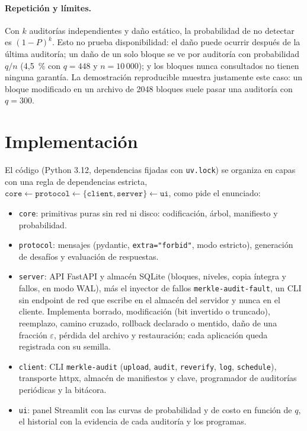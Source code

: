 \documentclass[11pt,a4paper]{article}
\newcommand{\code}[1]{\texttt{#1}}
\begin{document}
\paragraph{Repetición y límites.} Con $k$ auditorías independientes y daño estático, la probabilidad
de no detectar es $(1-P)^k$. Esto no prueba disponibilidad: el daño puede ocurrir después de la
última auditoría; un daño de un solo bloque se ve por auditoría con probabilidad $q/n$ (4,5~\% con
$q=448$ y $n=10\,000$); y los bloques nunca consultados no tienen ninguna garantía. La demostración
reproducible muestra justamente este caso: un bloque modificado en un archivo de 2048 bloques suele
pasar una auditoría con $q=300$.

\section{Implementación}
\label{sec:impl}

El código (Python 3.12, dependencias fijadas con \code{uv.lock}) se organiza en capas con una regla
de dependencias estricta, $\code{core}\leftarrow\code{protocol}\leftarrow\{\code{client},\code{server}\}\leftarrow\code{ui}$,
como pide el enunciado:

\begin{itemize}
\item \code{core}: primitivas puras sin red ni disco: codificación, árbol, manifiesto y probabilidad.
\item \code{protocol}: mensajes (pydantic, \code{extra="forbid"}, modo estricto), generación de
  desafíos y evaluación de respuestas.
\item \code{server}: API FastAPI y almacén SQLite (bloques, niveles, copia íntegra y fallos, en modo
  WAL), más el inyector de fallos \code{merkle-audit-fault}, un CLI sin endpoint de red que escribe
  en el almacén del servidor y nunca en el cliente. Implementa borrado, modificación (bit invertido o
  truncado), reemplazo, camino cruzado, rollback declarado o mentido, daño de una fracción $\varepsilon$,
  pérdida del archivo y restauración; cada aplicación queda registrada con su semilla.
\item \code{client}: CLI \code{merkle-audit} (\code{upload}, \code{audit}, \code{reverify},
  \code{log}, \code{schedule}), transporte httpx, almacén de manifiestos y clave, programador de
  auditorías periódicas y la bitácora.
\item \code{ui}: panel Streamlit con las curvas de probabilidad y de costo en función de $q$, el
  historial con la evidencia de cada auditoría y los programas.
\end{itemize}
\end{document}
